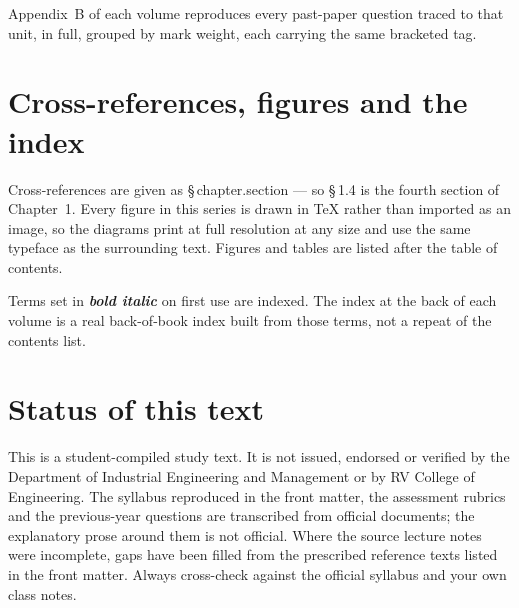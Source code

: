 \vspace{10pt}

Appendix~B of each volume reproduces every past-paper question traced to that
unit, in full, grouped by mark weight, each carrying the same bracketed tag.

\section*{Cross-references, figures and the index}

Cross-references are given as \S\,chapter.section --- so \S\,1.4 is the fourth
section of Chapter~1. Every figure in this series is drawn in \TeX{} rather
than imported as an image, so the diagrams print at full resolution at any
size and use the same typeface as the surrounding text. Figures and tables are
listed after the table of contents.

Terms set in \textbf{\textit{bold italic}} on first use are indexed. The index
at the back of each volume is a real back-of-book index built from those
terms, not a repeat of the contents list.

\section*{Status of this text}

\begin{warnbox}
This is a student-compiled study text. It is not issued, endorsed or verified
by the Department of Industrial Engineering and Management or by RV College of
Engineering. The syllabus reproduced in the front matter, the assessment
rubrics and the previous-year questions are transcribed from official
documents; the explanatory prose around them is not official. Where the source
lecture notes were incomplete, gaps have been filled from the prescribed
reference texts listed in the front matter. Always cross-check against the
official syllabus and your own class notes.
\end{warnbox}
